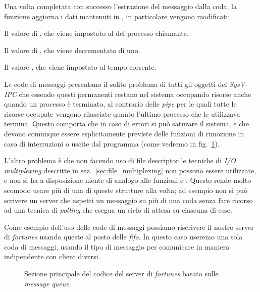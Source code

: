 Una volta completata con successo l'estrazione del messaggio dalla coda, la
funzione aggiorna i dati mantenuti in , in particolare
vengono modificati:
\begin{itemize*}
\item Il valore di , che viene impostato al  del
  processo chiamante.
\item Il valore di , che viene decrementato di uno.
\item Il valore , che viene impostato al tempo corrente.
\end{itemize*}

Le code di messaggi presentano il solito problema di tutti gli oggetti del
\textit{SysV-IPC} che essendo questi permanenti restano nel sistema occupando
risorse anche quando un processo è terminato, al contrario delle \textit{pipe}
per le quali tutte le risorse occupate vengono rilasciate quanto l'ultimo
processo che le utilizzava termina. Questo comporta che in caso di errori si
può saturare il sistema, e che devono comunque essere esplicitamente previste
delle funzioni di rimozione in caso di interruzioni o uscite dal programma
(come vedremo in fig.~\ref{fig:ipc_mq_fortune_server}).

L'altro problema è che non facendo uso di file descriptor le tecniche di
\textit{I/O multiplexing} descritte in sez.~\ref{sec:file_multiplexing} non
possono essere utilizzate, e non si ha a disposizione niente di analogo alle
funzioni  e . Questo rende molto scomodo usare più di
una di queste strutture alla volta; ad esempio non si può scrivere un server
che aspetti un messaggio su più di una coda senza fare ricorso ad una tecnica
di \textit{polling} che esegua un ciclo di attesa su ciascuna di esse.

Come esempio dell'uso delle code di messaggi possiamo riscrivere il nostro
server di \textit{fortunes} usando queste al posto delle \textit{fifo}. In
questo caso useremo una sola coda di messaggi, usando il tipo di messaggio per
comunicare in maniera indipendente con client diversi.

\begin{figure}[!htbp]
  \footnotesize \centering
  \begin{minipage}[c]{\codesamplewidth}
  \end{minipage} 
  \normalsize 
  \caption{Sezione principale del codice del server di \textit{fortunes}
    basato sulle \textit{message queue}.}
  \label{fig:ipc_mq_fortune_server}
\end{figure}

